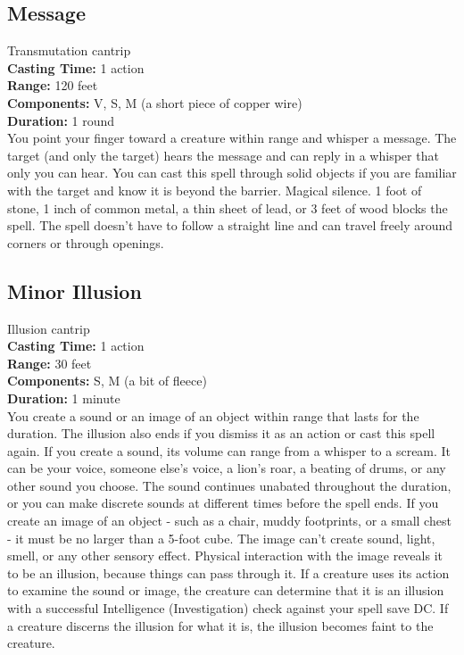 \documentclass[11pt, A4paper, english]{article}
\begin{document}
		\subsection{Message}
Transmutation cantrip \\
\textbf{Casting Time:} 1 action \\
\textbf{Range:} 120 feet \\
\textbf{Components:} V, S, M (a short piece of copper wire) \\
\textbf{Duration:} 1 round \\
You point your finger toward a creature within range and whisper a message. The target (and only the target) hears the message and can reply in a whisper that only you can hear. You can cast this spell through solid objects if you are familiar with the target and know it is beyond the barrier. Magical silence.  1  foot of stone,  1  inch of common metal, a thin sheet of lead, or 3 feet of wood blocks the spell. The spell doesn’t have to follow a straight line and can travel freely around corners or through openings.

		\subsection{Minor Illusion}
Illusion cantrip \\
\textbf{Casting Time:} 1 action \\
\textbf{Range:} 30 feet \\
\textbf{Components:} S, M (a bit of fleece) \\
\textbf{Duration:} 1 minute \\
You create a sound or an image of an object within range that lasts for the duration. The illusion also ends if you dismiss it as an action or cast this spell again. If you create a sound, its volume can range from a whisper to a scream. It can be your voice, someone else’s voice, a lion’s roar, a beating of drums, or any other sound you choose. The sound continues unabated throughout the duration, or you can make discrete sounds at different times before the spell ends. If you create an image of an object - such as a chair, muddy footprints, or a small chest - it must be no larger than a 5-foot cube. The image can’t create sound, light, smell, or any other sensory effect. Physical interaction with the image reveals it to be an illusion, because things can pass through it. If a creature uses its action to examine the sound or image, the creature can determine that it is an illusion with a successful Intelligence (Investigation) check against your spell save DC. If a creature discerns the illusion for what it is, the illusion becomes faint to the creature.
\end{document}
